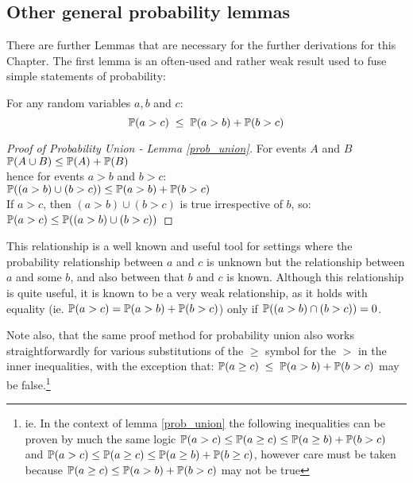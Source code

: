 \subsection{Other general probability lemmas}

There are further Lemmas that are necessary for the further derivations for this Chapter.
The first lemma is an often-used and rather weak result used to fuse simple statements of probability:
\begin{lemma}\label{prob_union}
For any random variables $a,b$ and $c$:
\[\operatorname{\mathbb{P}}(a>c) \; \le \; \operatorname{\mathbb{P}}(a>b) + \operatorname{\mathbb{P}}(b>c)\]
\end{lemma}
\begin{proof}[Proof of Probability Union - Lemma \ref{prob_union}]
For events $A$ and $B$\\$\operatorname{\mathbb{P}}(A\cup B) \le \operatorname{\mathbb{P}}(A)+\operatorname{\mathbb{P}}(B)$\\
hence for events $a>b$ and $b>c$:\\ $\operatorname{\mathbb{P}}((a>b) \cup (b>c)) \le \operatorname{\mathbb{P}}(a>b) + \operatorname{\mathbb{P}}(b>c)$\\
If $a>c$, then $(a>b) \cup (b>c)$ is true irrespective of $b$, so:\\
$\operatorname{\mathbb{P}}(a>c) \le \operatorname{\mathbb{P}}((a>b) \cup (b>c))$
\end{proof}
This relationship is a well known and useful tool for settings where the probability relationship between $a$ and $c$ is unknown but the relationship between $a$ and some $b$, and also between that $b$ and $c$ is known.
Although this relationship is quite useful, it is known to be a very weak relationship, as it holds with equality (ie. $\operatorname{\mathbb{P}}(a>c)=\operatorname{\mathbb{P}}(a>b)+\operatorname{\mathbb{P}}(b>c)$) only if $\operatorname{\mathbb{P}}((a>b)\cap(b>c))=0$.

Note also, that the same proof method for probability union also works straightforwardly for various substitutions of the $\ge$ symbol for the $>$ in the inner inequalities, with the exception that: $\operatorname{\mathbb{P}}(a\ge c) \; \le \; \operatorname{\mathbb{P}}(a>b) + \operatorname{\mathbb{P}}(b>c)$ may be false.\footnote{ie. In the context of lemma \ref{prob_union} the following inequalities can be proven by much the same logic $\operatorname{\mathbb{P}}(a>c)\le\operatorname{\mathbb{P}}(a\ge c)\le\operatorname{\mathbb{P}}(a\ge b)+\operatorname{\mathbb{P}}(b>c)$ and $\operatorname{\mathbb{P}}(a>c)\le\operatorname{\mathbb{P}}(a\ge c)\le\operatorname{\mathbb{P}}(a\ge b)+\operatorname{\mathbb{P}}(b\ge c)$, however care must be taken because $\operatorname{\mathbb{P}}(a\ge c)\le\operatorname{\mathbb{P}}(a>b)+\operatorname{\mathbb{P}}(b>c)$ may not be true}

